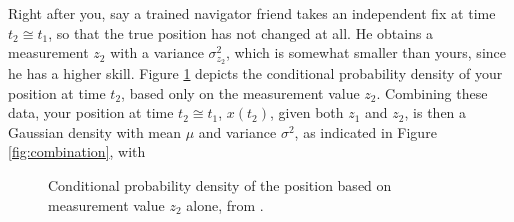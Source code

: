 Right after you, say a trained navigator friend takes an independent fix at time $t_2 \cong t_1$, so that the true position has not changed at all. He obtains a measurement $z_2$ with a variance $\sigma^2_{z_2}$, which is somewhat smaller than yours, since he has a higher skill. Figure \ref{fig:measurement_z2} depicts the conditional probability density of your position at time $t_2$, based only on the measurement value $z_2$. Combining these data, your position at time $t_2 \cong t_1$, $x(t_2)$, given both $z_1$ and $z_2$, is then a Gaussian density with mean $\mu$ and variance $\sigma^2$, as indicated in Figure \ref{fig:combination}, with

\begin{figure}
\centering
{}
\caption{Conditional probability density of the position based on measurement value $z_2$ alone, from \cite{Maybeck79}.} \label{fig:measurement_z2}
\end{figure}

